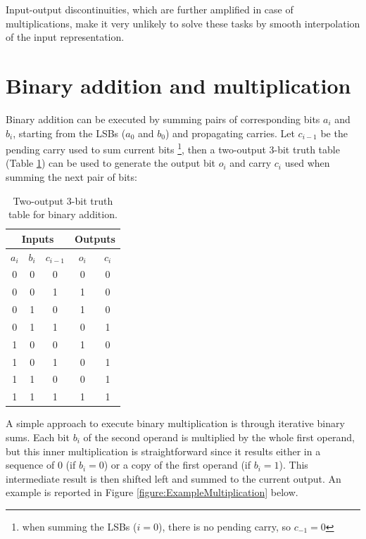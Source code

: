 \documentclass[final,1p,times,authoryear]{elsarticle}
\begin{document}
Input-output discontinuities, which are further amplified in case of multiplications, make it very unlikely to solve these tasks by smooth interpolation of the input representation.

\section{Binary addition and multiplication} \label{sec:AppendixB}

Binary addition can be executed by summing pairs of corresponding bits $a_i$ and $b_i$, starting from the LSBs ($a_0$ and $b_0$) and propagating carries. Let $c_{i-1}$ be the pending carry used to sum current bits \footnote{when summing the LSBs ($i=0$), there is no pending carry, so $c_{-1}=0$}, then a two-output 3-bit truth table (Table \ref{table:TwoOutputTruthTableForAddition}) can be used to generate the output bit $o_i$ and carry $c_i$ used when summing the next pair of bits:

\begin{table}[h!]
\caption{Two-output 3-bit truth table for binary addition.}
\label{table:TwoOutputTruthTableForAddition}
\begin{center}
\begin{tabular}{ |c|c|c|c|c| } 
 \hline
 \multicolumn{3}{|c|}{Inputs} & \multicolumn{2}{c|}{Outputs}  \\
 \hline
 $a_i$ & $b_i$ & $c_{i-1}$  & $o_i$ & $c_i$ \\ 
 \hline
 0 & 0 & 0 & 0 & 0 \\ 
 \hline
 0 & 0 & 1 & 1 & 0 \\ 
 \hline
 0 & 1 & 0 & 1 & 0 \\ 
 \hline
 0 & 1 & 1 & 0 & 1 \\ 
 \hline
 1 & 0 & 0 & 1 & 0 \\ 
 \hline
 1 & 0 & 1 & 0 & 1 \\ 
 \hline
 1 & 1 & 0 & 0 & 1 \\ 
 \hline
 1 & 1 & 1 & 1 & 1 \\ 
 \hline
 \end{tabular}
\end{center}
\end{table}

A simple approach to execute binary multiplication is through iterative binary sums. Each bit $b_i$ of the second operand is multiplied by the whole first operand, but this inner multiplication is straightforward since it results either in a sequence of 0 (if $b_i=0$) or a copy of the first operand (if $b_i=1$). This intermediate result is then shifted left and summed to the current output. An example is reported in Figure \ref{figure:ExampleMultiplication} below.
\end{document}
